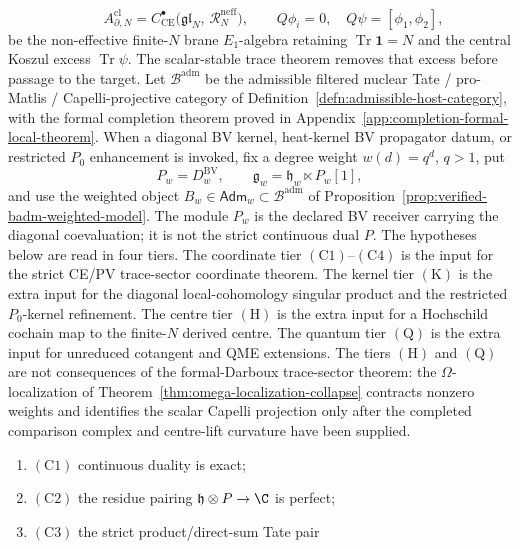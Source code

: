 \documentclass[11pt]{memoir}
\begin{document}
\begin{thm}
\[    \qquad
    A^{\mathrm{cl}}_{\partial,N}=
    C^\bullet_{\mathrm{CE}}\bigl(\mathfrak{gl}_N,\,
       \mathcal R_N^{\mathrm{neff}}\bigr),
    \qquad
    Q\phi_i=0,\quad Q\psi=[\phi_1,\phi_2],
  \]
  be the non-effective finite-\(N\) brane \(E_1\)-algebra retaining
  \(\operatorname{Tr}\mathbf 1=N\) and the central Koszul excess
  \(\operatorname{Tr}\psi\).  The scalar-stable trace theorem removes
  that excess before passage to the target.  Let
  \(\mathcal B^{\mathrm{adm}}\) be the admissible filtered nuclear Tate /
  pro-Matlis / Capelli-projective category of
  Definition~\ref{defn:admissible-host-category}, with the formal
  completion theorem proved in
  Appendix~\ref{app:completion-formal-local-theorem}.  When a
	  diagonal BV kernel, heat-kernel BV propagator datum, or restricted
	  \(P_0\) enhancement is invoked, fix a degree weight \(w(d)=q^d\), \(q>1\),
	  put
	  \[
	    P_w=D^{\mathrm{BV}}_w,\qquad
	    \mathfrak g_w=\mathfrak h_w\ltimes P_w[1],
	  \]
	  and use the weighted object
		  \(B_w\in\mathsf{Adm}_w\subset\mathcal B^{\mathrm{adm}}\) of
		  Proposition~\ref{prop:verified-badm-weighted-model}.  The module
		  \(P_w\) is the declared BV receiver carrying the diagonal
		  coevaluation; it is not the strict continuous dual \(P\).
  The hypotheses below are read in four tiers.  The coordinate tier
  \(\mathrm{(C1)}\)--\(\mathrm{(C4)}\) is the input for the strict
  CE/PV trace-sector coordinate theorem.  The kernel tier
  \(\mathrm{(K)}\) is the extra input for the diagonal local-cohomology
  singular product and the restricted \(P_0\)-kernel refinement.  The
  centre tier \(\mathrm{(H)}\) is the extra input for a Hochschild
  cochain map to the finite-\(N\) derived centre.  The quantum tier
  \(\mathrm{(Q)}\) is the extra input for unreduced cotangent and QME
  extensions.  The tiers \(\mathrm{(H)}\) and \(\mathrm{(Q)}\) are not
  consequences of the formal-Darboux trace-sector theorem: the
  \(\Omega\)-localization of Theorem~\ref{thm:omega-localization-collapse}
  contracts nonzero weights and identifies the scalar Capelli projection
  only after the completed comparison complex and centre-lift curvature
  have been supplied.
  \begin{enumerate}[label=\textup{(\roman*)}]
    \item \(\mathrm{(C1)}\) continuous duality is exact;
    \item \(\mathrm{(C2)}\) the residue pairing $\mathfrak h\otimes P\to\C$
      is perfect;
    \item \(\mathrm{(C3)}\) the strict product/direct-sum Tate pair

\end{enumerate}
\end{thm}
\end{document}
